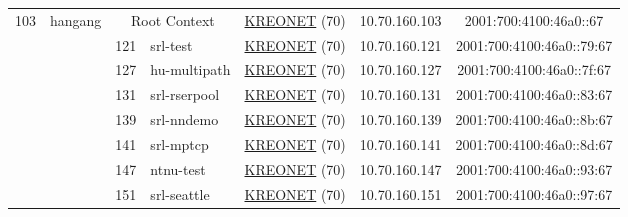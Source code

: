 \begin{small}
\begin{center}
\begin{longtable}{|c|c|c|c|c|c|c|c|}
 \multirow{8}{*}{\tiny{103}} & \multicolumn{1}{|l|}{\multirow{8}{*}{\tiny{hangang}}} & \multicolumn{2}{|c|}{\tiny{Root Context}} & \multicolumn{2}{|c|}{\tiny{\href{http://www.kreonet.net}{KREONET} (70)}} & \tiny{10.70.160.103} & \tiny{2001:700:4100:46a0::67} \\* \cline{3-3}\cline{4-4}\cline{5-5}\cline{6-6}\cline{7-7}\cline{8-8}
  &  & \tiny{121} & \multicolumn{1}{|l|}{\tiny{srl-test}} & \multicolumn{2}{|c|}{\tiny{\href{http://www.kreonet.net}{KREONET} (70)}} & \tiny{10.70.160.121} & \tiny{2001:700:4100:46a0::79:67} \\* \cline{3-3}\cline{4-4}\cline{5-5}\cline{6-6}\cline{7-7}\cline{8-8}
  &  & \tiny{127} & \multicolumn{1}{|l|}{\tiny{hu-multipath}} & \multicolumn{2}{|c|}{\tiny{\href{http://www.kreonet.net}{KREONET} (70)}} & \tiny{10.70.160.127} & \tiny{2001:700:4100:46a0::7f:67} \\* \cline{3-3}\cline{4-4}\cline{5-5}\cline{6-6}\cline{7-7}\cline{8-8}
  &  & \tiny{131} & \multicolumn{1}{|l|}{\tiny{srl-rserpool}} & \multicolumn{2}{|c|}{\tiny{\href{http://www.kreonet.net}{KREONET} (70)}} & \tiny{10.70.160.131} & \tiny{2001:700:4100:46a0::83:67} \\* \cline{3-3}\cline{4-4}\cline{5-5}\cline{6-6}\cline{7-7}\cline{8-8}
  &  & \tiny{139} & \multicolumn{1}{|l|}{\tiny{srl-nndemo}} & \multicolumn{2}{|c|}{\tiny{\href{http://www.kreonet.net}{KREONET} (70)}} & \tiny{10.70.160.139} & \tiny{2001:700:4100:46a0::8b:67} \\* \cline{3-3}\cline{4-4}\cline{5-5}\cline{6-6}\cline{7-7}\cline{8-8}
  &  & \tiny{141} & \multicolumn{1}{|l|}{\tiny{srl-mptcp}} & \multicolumn{2}{|c|}{\tiny{\href{http://www.kreonet.net}{KREONET} (70)}} & \tiny{10.70.160.141} & \tiny{2001:700:4100:46a0::8d:67} \\* \cline{3-3}\cline{4-4}\cline{5-5}\cline{6-6}\cline{7-7}\cline{8-8}
  &  & \tiny{147} & \multicolumn{1}{|l|}{\tiny{ntnu-test}} & \multicolumn{2}{|c|}{\tiny{\href{http://www.kreonet.net}{KREONET} (70)}} & \tiny{10.70.160.147} & \tiny{2001:700:4100:46a0::93:67} \\* \cline{3-3}\cline{4-4}\cline{5-5}\cline{6-6}\cline{7-7}\cline{8-8}
  &  & \tiny{151} & \multicolumn{1}{|l|}{\tiny{srl-seattle}} & \multicolumn{2}{|c|}{\tiny{\href{http://www.kreonet.net}{KREONET} (70)}} & \tiny{10.70.160.151} & \tiny{2001:700:4100:46a0::97:67} \\ \hline
\end{longtable}
\end{center}
\end{small}




